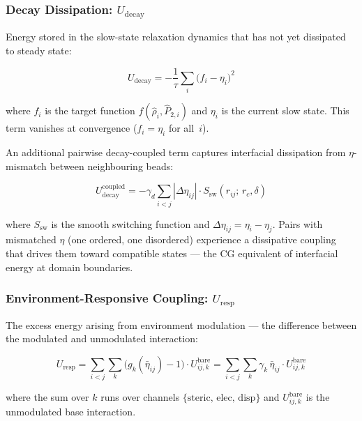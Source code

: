 \documentclass[11pt, a4paper, oneside]{article}
\begin{document}
\subsubsection{Decay Dissipation:
  \texorpdfstring{$U_{\mathrm{decay}}$}{U\_decay}}

Energy stored in the slow-state relaxation dynamics that has not yet
dissipated to steady state:

\begin{equation}
U_{\mathrm{decay}} = -\frac{1}{\tau}\sum_i
  \bigl(f_i - \eta_i\bigr)^2
\label{eq:Udecay}
\end{equation}

where $f_i$ is the target function $f(\hat\rho_i, \hat P_{2,i})$
and $\eta_i$ is the current slow state.  This term vanishes at
convergence ($f_i = \eta_i$ for all~$i$).

An additional pairwise decay-coupled term captures interfacial
dissipation from $\eta$-mismatch between neighbouring beads:

\begin{equation}
U_{\mathrm{decay}}^{\mathrm{coupled}}
= -\gamma_d \sum_{i < j}
  |\Delta\eta_{ij}|\cdot S_{\mathrm{sw}}(r_{ij};\, r_c, \delta)
\label{eq:Udecay_coupled}
\end{equation}

where $S_{\mathrm{sw}}$ is the smooth switching function and
$\Delta\eta_{ij} = \eta_i - \eta_j$.  Pairs with mismatched
$\eta$ (one ordered, one disordered) experience a dissipative
coupling that drives them toward compatible states — the CG
equivalent of interfacial energy at domain boundaries.

\subsubsection{Environment-Responsive Coupling:
  \texorpdfstring{$U_{\mathrm{resp}}$}{U\_resp}}

The excess energy arising from environment modulation — the difference
between the modulated and unmodulated interaction:

\begin{equation}
U_{\mathrm{resp}} = \sum_{i < j}\sum_k
  \bigl(g_k(\bar\eta_{ij}) - 1\bigr)\cdot U_{ij,k}^{\mathrm{bare}}
= \sum_{i < j}\sum_k
  \gamma_k\,\bar\eta_{ij}\cdot U_{ij,k}^{\mathrm{bare}}
\label{eq:Uresp}
\end{equation}

where the sum over $k$ runs over channels
$\{\mathrm{steric},\,\mathrm{elec},\,\mathrm{disp}\}$
and $U_{ij,k}^{\mathrm{bare}}$ is the unmodulated base interaction.
\end{document}
